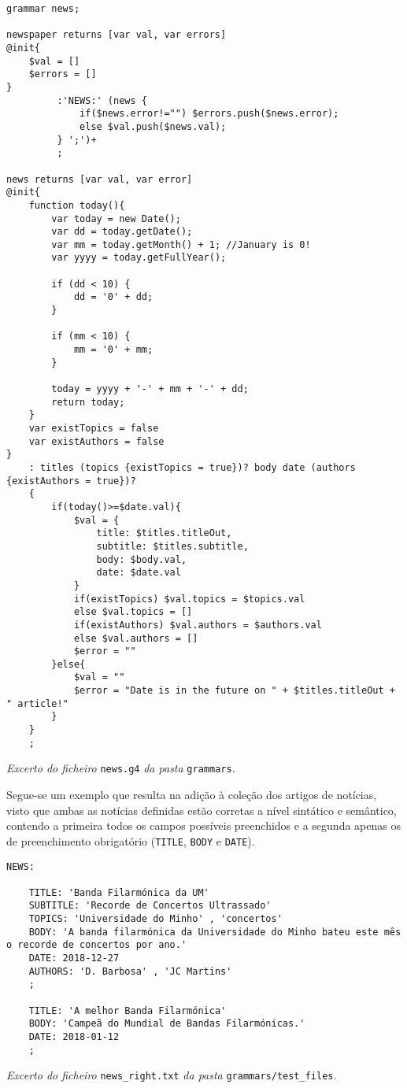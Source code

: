 \begin{framed}
\begin{lstlisting}[language=ANTLR]
grammar news;

newspaper returns [var val, var errors]
@init{
	$val = []
	$errors = []
}
		 :'NEWS:' (news {
			 if($news.error!="") $errors.push($news.error);
			 else $val.push($news.val);
		 } ';')+
		 ;

news returns [var val, var error]
@init{
	function today(){
		var today = new Date();
		var dd = today.getDate();
		var mm = today.getMonth() + 1; //January is 0!
		var yyyy = today.getFullYear();

		if (dd < 10) {
			dd = '0' + dd;
		}

		if (mm < 10) {
			mm = '0' + mm;
		}

		today = yyyy + '-' + mm + '-' + dd;
		return today;
	}
	var existTopics = false
	var existAuthors = false
}
	: titles (topics {existTopics = true})? body date (authors {existAuthors = true})?
	{
		if(today()>=$date.val){
			$val = {
				title: $titles.titleOut,
				subtitle: $titles.subtitle,
				body: $body.val,
				date: $date.val
			}
			if(existTopics) $val.topics = $topics.val
			else $val.topics = []
			if(existAuthors) $val.authors = $authors.val
			else $val.authors = []
			$error = ""
		}else{
			$val = ""
			$error = "Date is in the future on " + $titles.titleOut + " article!"
		}
	}
    ;
\end{lstlisting}
\end{framed}
\begin{center}
\textit{Excerto do ficheiro} \texttt{news.g4} \textit{da pasta} \texttt{grammars}.
\end{center}


Segue-se um exemplo que resulta na adição à coleção dos artigos de notícias, visto que ambas as notícias definidas estão corretas a nível sintático e semântico, contendo a primeira todos os campos possíveis preenchidos e a segunda apenas os de preenchimento obrigatório (\texttt{TITLE}, \texttt{BODY} e \texttt{DATE}).
\begin{framed}
\begin{lstlisting}[language=ANTLR]
    NEWS:
    
    TITLE: 'Banda Filarmónica da UM'
    SUBTITLE: 'Recorde de Concertos Ultrassado'
    TOPICS: 'Universidade do Minho' , 'concertos'
    BODY: 'A banda filarmónica da Universidade do Minho bateu este mês o recorde de concertos por ano.'
    DATE: 2018-12-27
    AUTHORS: 'D. Barbosa' , 'JC Martins'
    ;
    
    TITLE: 'A melhor Banda Filarmónica'
    BODY: 'Campeã do Mundial de Bandas Filarmónicas.'
    DATE: 2018-01-12
    ;
\end{lstlisting}
\end{framed}
\begin{center}
\textit{Excerto do ficheiro} \texttt{news\_right.txt} \textit{da pasta} \texttt{grammars/test\_files}.
\end{center}

